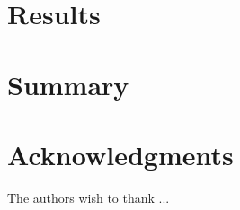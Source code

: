 \documentclass[final,authoryear,5p,times,twocolumn]{elsarticle}
\begin{document}
\section{Results}

\section{Summary}

\section{Acknowledgments}


The authors wish to thank ...




\end{document}
